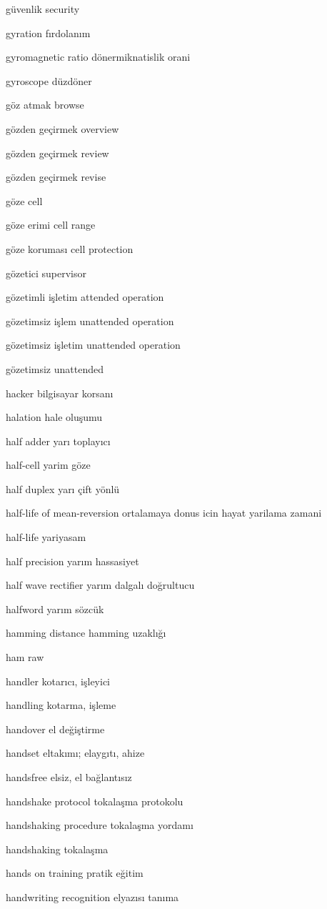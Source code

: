 \documentclass[12pt,fleqn]{article}\usepackage{../../common}
\begin{document}
güvenlik security

gyration fırdolanım

gyromagnetic ratio dönermiknatislik orani

gyroscope düzdöner

göz atmak browse

gözden geçirmek overview

gözden geçirmek review

gözden geçirmek revise

göze cell

göze erimi cell range

göze koruması cell protection

gözetici supervisor

gözetimli işletim attended operation

gözetimsiz işlem unattended operation

gözetimsiz işletim unattended operation

gözetimsiz unattended

hacker bilgisayar korsanı

halation hale oluşumu

half adder yarı toplayıcı

half-cell yarim göze

half duplex yarı çift yönlü

half-life of mean-reversion ortalamaya donus icin hayat yarilama zamani

half-life yariyasam

half precision yarım hassasiyet

half wave rectifier yarım dalgalı doğrultucu

halfword yarım sözcük

hamming distance hamming uzaklığı

ham raw

handler kotarıcı, işleyici

handling kotarma, işleme

handover el değiştirme

handset eltakımı; elaygıtı, ahize

handsfree elsiz, el bağlantısız

handshake protocol tokalaşma protokolu

handshaking procedure tokalaşma yordamı

handshaking tokalaşma

hands on training pratik eğitim

handwriting recognition elyazısı tanıma
\end{document}
